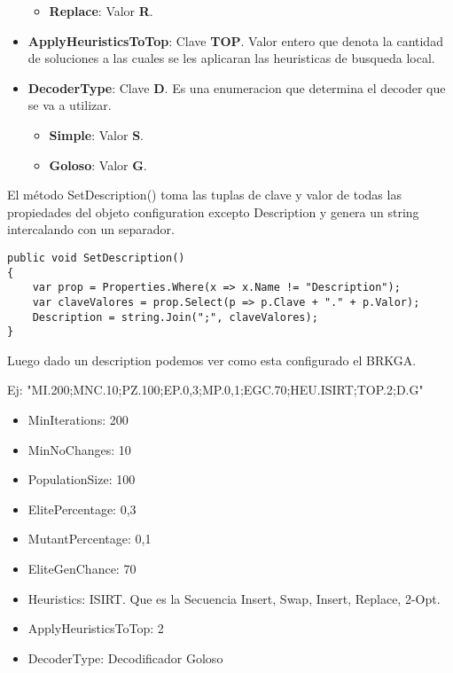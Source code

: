 \begin{itemize}
\begin{itemize}
		\item \textbf{Replace}: Valor \textbf{R}.
	\end{itemize}  
  \item \textbf{ApplyHeuristicsToTop}: Clave \textbf{TOP}. Valor entero que denota la cantidad de soluciones a las cuales se les aplicaran las heuristicas de busqueda local.
  \item \textbf{DecoderType}: Clave \textbf{D}. Es una enumeracion que determina el decoder que se va a utilizar.
	\begin{itemize}
		\item \textbf{Simple}: Valor \textbf{S}.
		\item \textbf{Goloso}: Valor \textbf{G}.
	\end{itemize}  
\end{itemize}

\bigskip

El método SetDescription() toma las tuplas de clave y valor de todas las propiedades del objeto configuration excepto Description y genera un string intercalando con un separador.

\begin{minipage}{\textwidth}
\begin{lstlisting} 
public void SetDescription()
{ 
	var prop = Properties.Where(x => x.Name != "Description");
	var claveValores = prop.Select(p => p.Clave + "." + p.Valor);
	Description = string.Join(";", claveValores);
}
\end{lstlisting}
\end{minipage}


\begin{minipage}{\textwidth}
Luego dado un description podemos ver como esta configurado el BRKGA.

Ej: "MI.200;MNC.10;PZ.100;EP.0,3;MP.0,1;EGC.70;HEU.ISIRT;TOP.2;D.G"

\begin{itemize}
  \item MinIterations: 200
  \item MinNoChanges: 10
  \item PopulationSize: 100
  \item ElitePercentage: 0,3
  \item MutantPercentage: 0,1
  \item EliteGenChance: 70
  \item Heuristics: ISIRT. Que es la Secuencia Insert, Swap, Insert, Replace, 2-Opt.
  \item ApplyHeuristicsToTop: 2
  \item DecoderType: Decodificador Goloso
\end{itemize}
\end{minipage}

